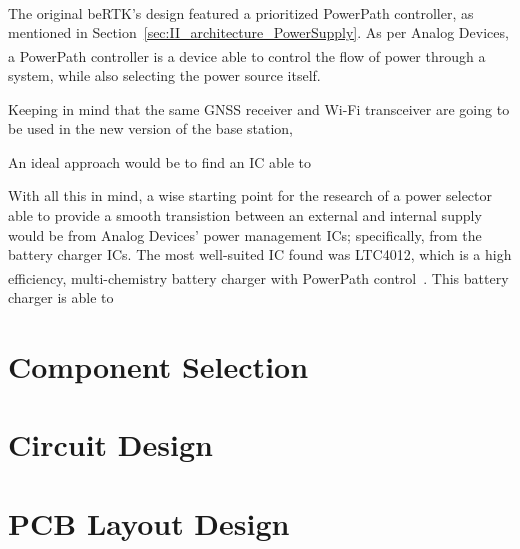 The original beRTK\textsuperscript{\textregistered}'s design featured a prioritized PowerPath\textsuperscript{\texttrademark} controller, as mentioned in Section~\ref{sec:II_architecture_PowerSupply}. As per Analog Devices, a PowerPath\textsuperscript{\texttrademark} controller is a device able to control the flow of power through a system, while also selecting the power source itself.

Keeping in mind that the same GNSS receiver and Wi-Fi transceiver are going to be used in the new version of the base station, 

An ideal approach would be to find an IC able to 

With all this in mind, a wise starting point for the research of a power selector able to provide a smooth transistion between an external and internal supply would be from Analog Devices' power management ICs; specifically, from the battery charger ICs. The most well-suited IC found was LTC4012, which is a high efficiency, multi-chemistry battery charger with PowerPath\textsuperscript{\texttrademark} control~\cite{LTC4012}. This battery charger is able to

\section{Component Selection}\label{32_ComponentSelection}

\section{Circuit Design}\label{33_Circuit}

\section{PCB Layout Design}\label{34_PCBlayout}

